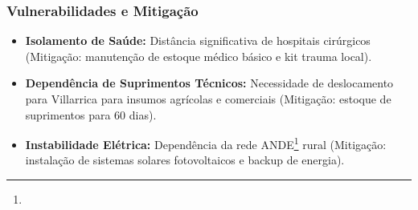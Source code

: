 \subsubsection{Vulnerabilidades e
Mitigação}

\begin{itemize}
\tightlist
\item
  \textbf{Isolamento de Saúde:} Distância significativa de hospitais
  cirúrgicos (Mitigação: manutenção de estoque médico básico e kit
  trauma local).
\item
  \textbf{Dependência de Suprimentos Técnicos:} Necessidade de
  deslocamento para Villarrica para insumos agrícolas e comerciais
  (Mitigação: estoque de suprimentos para 60 dias).
\item
  \textbf{Instabilidade Elétrica:} Dependência da rede ANDE\footnote{\fineANDE} rural
  (Mitigação: instalação de sistemas solares fotovoltaicos e backup de
  energia).
\end{itemize}

